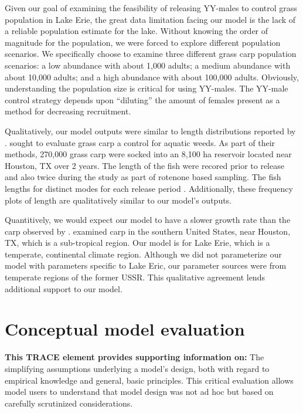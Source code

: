 \documentclass{article}[12pt]
\begin{document}
Given our goal of examining the feasibility of releasing YY-males to control grass population in Lake Erie, the great data limitation facing our model is the lack of a reliable population estimate for the lake.
Without knowing the order of magnitude for the population, we were forced to explore different population scenarios. 
We specifically choose to examine three different grass carp population scenarios: 
a low abundance with about 1,000 adults;
a medium abundance with about 10,000 adults;
and a high abundance with about 100,000 adults.
Obviously, understanding the population size is critical for using YY-males. 
The YY-male control strategy depends upon ``diluting'' the amount of females present as a method for decreasing recruitment.


Qualitatively, our model outputs were similar to length distributions reported by \citet{martyn1986mapping}.
\citet{martyn1986mapping} sought to evaluate grass carp a control for aquatic weeds.
As part of their methods, 270,000 grass carp were socked into an 8,100 ha reservoir located near Houston, TX over 2 years. 
The length of the fish were recored prior to release and also twice during the study as part of rotenone based sampling.
The fish lengths for distinct modes for each release period \citep[Figure 11 in][]{martyn1986mapping}.
Additionally, these frequency plots of length are qualitatively similar to our model's outputs. 

Quantitively, we would expect our model to have a slower growth rate than the carp observed by \citet{martyn1986mapping}.
\citet{martyn1986mapping} examined carp in the southern United States, near Houston, TX, which is a sub-tropical region.
Our model is for Lake Erie, which is a temperate, continental climate region.
Although we did not parameterize our model with parameters specific to Lake Eric, our parameter sources were from temperate regions of the former USSR. 
This qualitative agreement lends additional support to our model. 


\section{Conceptual model evaluation}
\textbf{This TRACE element provides supporting information on:} The simplifying assumptions underlying a model's design, both with regard to empirical knowledge and general, basic principles. This critical evaluation allows model users to understand that model design was not ad hoc but based on carefully scrutinized considerations. 
\end{document}
